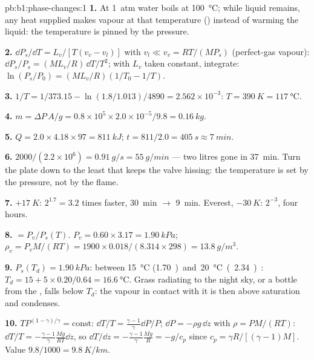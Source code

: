 \begin{solution}{pb:b1:phase-changes:1}
\textbf{1.} At \qty{1}{atm} water boils at \qty{100}{\degreeCelsius}; while
liquid remains, any heat supplied makes vapour at that temperature
() instead of warming the liquid: the temperature is pinned
by the pressure.

\textbf{2.} $\dd P_s/\dd T = L_v/[T(v_v - v_l)]$ with $v_l \ll v_v = RT/(MP_s)$
(perfect-gas vapour): $\dd P_s/P_s = (ML_v/R)\,\dd T/T^2$; with $L_v$ taken
constant, integrate: $\ln(P_s/P_0) = (ML_v/R)(1/T_0 - 1/T)$.

\textbf{3.} $1/T = 1/373.15 - \ln(1.8/1.013)/4890 = 2.562 \times 10^{-3}$: $T =
\qty{390}{K} = \qty{117}{\degreeCelsius}$.

\textbf{4.} $m = \Delta P\,A/g = 0.8 \times 10^5 \times 2.0 \times 10^{-5}/9.8 =
\qty{0.16}{kg}$.

\textbf{5.} $Q = 2.0 \times 4.18 \times 97 = \qty{811}{kJ}$; $t = 811/2.0 =
\qty{405}{s} \approx \qty{7}{min}$.

\textbf{6.} $2000/(2.2 \times 10^6) = \qty{0.91}{g/s} = \qty{55}{g/min}$ --- two
litres gone in \qty{37}{min}. Turn the plate down to the least that
keeps the valve hissing: the temperature is set by the pressure, not by
the flame.

\textbf{7.} $+\qty{17}{K}$: $2^{1.7} = 3.2$ times faster, \qty{30}{min}
$\to$ \qty{9}{min}. Everest, $-\qty{30}{K}$: $2^{-3}$, four hours.

\textbf{8.}  $= P_v/P_s(T)$. $P_v = 0.60 \times 3.17 =
\qty{1.90}{kPa}$; $\rho_v = P_vM/(RT) = 1900 \times 0.018/(8.314 \times 298) =
\qty{13.8}{g/m^3}$.

\textbf{9.} $P_s(T_d) = \qty{1.90}{kPa}$: between \qty{15}{\degreeCelsius}
(\qty{1.70}) and \qty{20}{\degreeCelsius} (\qty{2.34}): $T_d = 15 + 5 \times 0.20/0.64
= \qty{16.6}{\degreeCelsius}$. Grass radiating to the night sky, or a
bottle from the , falls below $T_d$: the vapour in contact
with it is then above saturation and condenses.

\textbf{10.} $TP^{(1-\gamma)/\gamma} = \text{const}$: $\dd T/T = \frac{\gamma - 1}{\gamma}
\dd P/P$; $\dd P = -\rho g\,\dd z$ with $\rho = PM/(RT)$: $\dd T/T = -\frac{\gamma -
1}{\gamma}\frac{Mg}{RT}\dd z$, so $\dd T/\dd z = -\frac{\gamma - 1}{\gamma}\frac{Mg}{R} =
-g/c_p$ since $c_p = \gamma R/[(\gamma - 1)M]$. Value $9.8/1000 = \qty{9.8}{K/km}$.


\end{solution}
